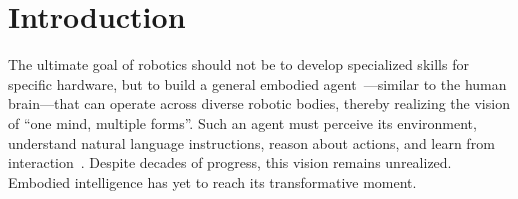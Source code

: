 \section{Introduction}
\label{sec:intro}

The ultimate goal of robotics should not be to develop specialized skills for specific hardware, but to build a general embodied agent~\cite{pi_0.5,shukor2025smolvla,eo1,zheng26}---similar to the human brain---that can operate across diverse robotic bodies, thereby realizing the vision of ``one mind, multiple forms''. Such an agent must perceive its environment, understand natural language instructions, reason about actions, and learn from interaction~\cite{rt2,liu2026rdt2,cheang2025gr,zheng25}. Despite decades of progress, this vision remains unrealized. Embodied intelligence has yet to reach its transformative moment.

